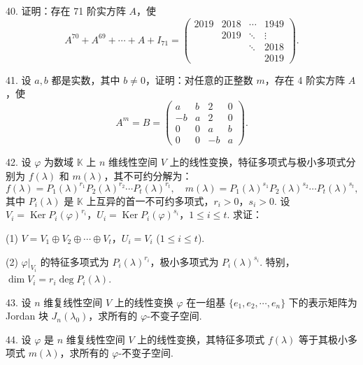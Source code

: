 \documentclass[UTF8, 12pt, fontset=fandol, oneside]{ctexart}
\begin{document}
40. 证明：存在 71 阶实方阵 $A$，使
\[
A^{70}+A^{69}+\cdots+A+I_{71}=\left(\begin{array}{ccccc}
2019 & 2018 & \cdots & 1949\\
& 2019 & \ddots & \vdots\\
& & \ddots & 2018\\
& & & 2019
\end{array}\right).
\]

41. 设 $a,b$ 都是实数，其中 $b\ne 0$，证明：对任意的正整数 $m$，存在 4 阶实方阵 $A$，使
\[
A^m=B=\left(\begin{array}{rrrr}
a & b & 2 & 0\\
-b & a & 2 & 0\\
0 & 0 & a & b\\
0 & 0 & -b & a
\end{array}\right).
\]

42. 设 $\varphi$ 为数域 $\mathbb K$ 上 $n$ 维线性空间 $V$ 上的线性变换，特征多项式与极小多项式分别为 $f(\lambda)$ 和 $m(\lambda)$，其不可约分解为：
\[
f(\lambda)=P_1(\lambda)^{r_1}P_2(\lambda)^{r_2}\cdots P_t(\lambda)^{r_t},\quad
m(\lambda)=P_1(\lambda)^{s_1}P_2(\lambda)^{s_2}\cdots P_t(\lambda)^{s_t},
\]
其中 $P_i(\lambda)$ 是 $\mathbb K$ 上互异的首一不可约多项式，$r_i>0$，$s_i>0$. 设 $V_i=\operatorname{Ker}P_i(\varphi)^{r_i}$，$U_i=\operatorname{Ker}P_i(\varphi)^{s_i}$，$1\leq i\leq t$. 求证：

(1) $V=V_1\oplus V_2\oplus\cdots\oplus V_t$，$U_i=V_i$ ($1\leq i\leq t$).

(2) $\varphi|_{V_i}$ 的特征多项式为 $P_i(\lambda)^{r_i}$，极小多项式为 $P_i(\lambda)^{s_i}$. 特别，$\dim V_i=r_i\deg P_i(\lambda)$.

43. 设 $n$ 维复线性空间 $V$ 上的线性变换 $\varphi$ 在一组基 $\{e_1,e_2,\cdots,e_n\}$ 下的表示矩阵为 Jordan 块 $J_n(\lambda_0)$，求所有的 $\varphi$-不变子空间.

44. 设 $\varphi$ 是 $n$ 维复线性空间 $V$ 上的线性变换，其特征多项式 $f(\lambda)$ 等于其极小多项式 $m(\lambda)$，求所有的 $\varphi$-不变子空间.
\end{document}
